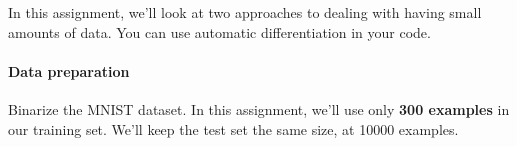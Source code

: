\documentclass{harvardml}
\theoremstyle{plain}
\begin{document}
In this assignment, we'll look at two approaches to dealing with having small amounts of data.
You can use automatic differentiation in your code.

\vspace{0.2cm}

\paragraph{Data preparation}  Binarize the MNIST dataset.
In this assignment, we'll use only \textbf{300 examples} in our training set.
We'll keep the test set the same size, at 10000 examples.




\end{document}
